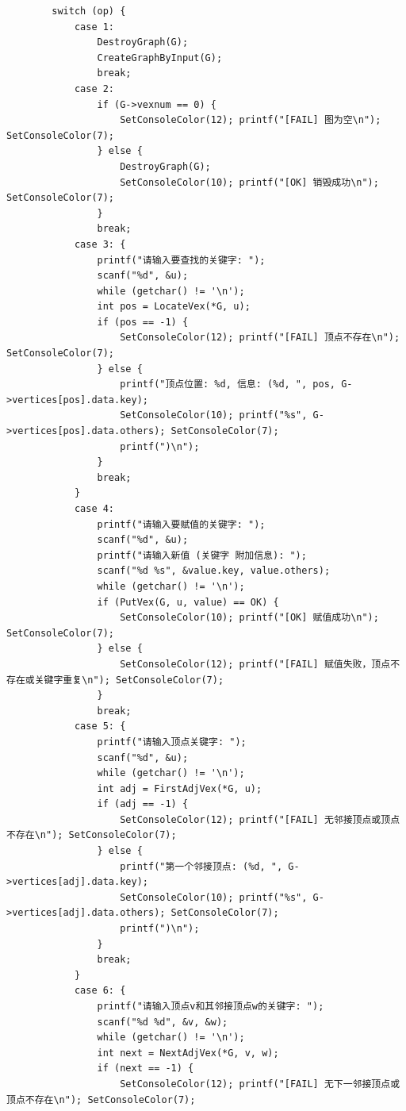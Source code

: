 \documentclass[supercite]{Experimental_Report}
\begin{document}
{\begin{lstlisting}
        switch (op) {
            case 1:
                DestroyGraph(G);
                CreateGraphByInput(G);
                break;
            case 2:
                if (G->vexnum == 0) {
                    SetConsoleColor(12); printf("[FAIL] 图为空\n"); SetConsoleColor(7);
                } else {
                    DestroyGraph(G);
                    SetConsoleColor(10); printf("[OK] 销毁成功\n"); SetConsoleColor(7);
                }
                break;
            case 3: {
                printf("请输入要查找的关键字: ");
                scanf("%d", &u);
                while (getchar() != '\n');
                int pos = LocateVex(*G, u);
                if (pos == -1) {
                    SetConsoleColor(12); printf("[FAIL] 顶点不存在\n"); SetConsoleColor(7);
                } else {
                    printf("顶点位置: %d, 信息: (%d, ", pos, G->vertices[pos].data.key);
                    SetConsoleColor(10); printf("%s", G->vertices[pos].data.others); SetConsoleColor(7);
                    printf(")\n");
                }
                break;
            }
            case 4:
                printf("请输入要赋值的关键字: ");
                scanf("%d", &u);
                printf("请输入新值 (关键字 附加信息): ");
                scanf("%d %s", &value.key, value.others);
                while (getchar() != '\n');
                if (PutVex(G, u, value) == OK) {
                    SetConsoleColor(10); printf("[OK] 赋值成功\n"); SetConsoleColor(7);
                } else {
                    SetConsoleColor(12); printf("[FAIL] 赋值失败，顶点不存在或关键字重复\n"); SetConsoleColor(7);
                }
                break;
            case 5: {
                printf("请输入顶点关键字: ");
                scanf("%d", &u);
                while (getchar() != '\n');
                int adj = FirstAdjVex(*G, u);
                if (adj == -1) {
                    SetConsoleColor(12); printf("[FAIL] 无邻接顶点或顶点不存在\n"); SetConsoleColor(7);
                } else {
                    printf("第一个邻接顶点: (%d, ", G->vertices[adj].data.key);
                    SetConsoleColor(10); printf("%s", G->vertices[adj].data.others); SetConsoleColor(7);
                    printf(")\n");
                }
                break;
            }
            case 6: {
                printf("请输入顶点v和其邻接顶点w的关键字: ");
                scanf("%d %d", &v, &w);
                while (getchar() != '\n');
                int next = NextAdjVex(*G, v, w);
                if (next == -1) {
                    SetConsoleColor(12); printf("[FAIL] 无下一邻接顶点或顶点不存在\n"); SetConsoleColor(7);

\end{lstlisting}}
\end{document}

